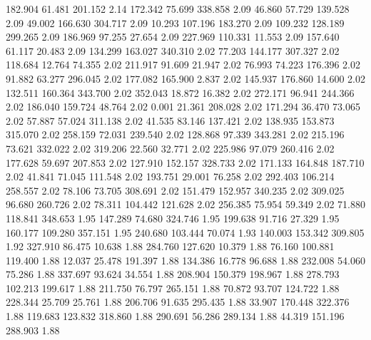  182.904   61.481  201.152         2.14
 172.342   75.699  338.858         2.09
  46.860   57.729  139.528         2.09
  49.002  166.630  304.717         2.09
  10.293  107.196  183.270         2.09
 109.232  128.189  299.265         2.09
 186.969   97.255   27.654         2.09
 227.969  110.331   11.553         2.09
 157.640   61.117   20.483         2.09
 134.299  163.027  340.310         2.02
  77.203  144.177  307.327         2.02
 118.684   12.764   74.355         2.02
 211.917   91.609   21.947         2.02
  76.993   74.223  176.396         2.02
  91.882   63.277  296.045         2.02
 177.082  165.900    2.837         2.02
 145.937  176.860   14.600         2.02
 132.511  160.364  343.700         2.02
 352.043   18.872   16.382         2.02
 272.171   96.941  244.366         2.02
 186.040  159.724   48.764         2.02
   0.001   21.361  208.028         2.02
 171.294   36.470   73.065         2.02
  57.887   57.024  311.138         2.02
  41.535   83.146  137.421         2.02
 138.935  153.873  315.070         2.02
 258.159   72.031  239.540         2.02
 128.868   97.339  343.281         2.02
 215.196   73.621  332.022         2.02
 319.206   22.560   32.771         2.02
 225.986   97.079  260.416         2.02
 177.628   59.697  207.853         2.02
 127.910  152.157  328.733         2.02
 171.133  164.848  187.710         2.02
  41.841   71.045  111.548         2.02
 193.751   29.001   76.258         2.02
 292.403  106.214  258.557         2.02
  78.106   73.705  308.691         2.02
 151.479  152.957  340.235         2.02
 309.025   96.680  260.726         2.02
  78.311  104.442  121.628         2.02
 256.385   75.954   59.349         2.02
  71.880  118.841  348.653         1.95
 147.289   74.680  324.746         1.95
 199.638   91.716   27.329         1.95
 160.177  109.280  357.151         1.95
 240.680  103.444   70.074         1.93
 140.003  153.342  309.805         1.92
 327.910   86.475   10.638         1.88
 284.760  127.620   10.379         1.88
  76.160  100.881  119.400         1.88
  12.037   25.478  191.397         1.88
 134.386   16.778   96.688         1.88
 232.008   54.060   75.286         1.88
 337.697   93.624   34.554         1.88
 208.904  150.379  198.967         1.88
 278.793  102.213  199.617         1.88
 211.750   76.797  265.151         1.88
  70.872   93.707  124.722         1.88
 228.344   25.709   25.761         1.88
 206.706   91.635  295.435         1.88
  33.907  170.448  322.376         1.88
 119.683  123.832  318.860         1.88
 290.691   56.286  289.134         1.88
  44.319  151.196  288.903         1.88
